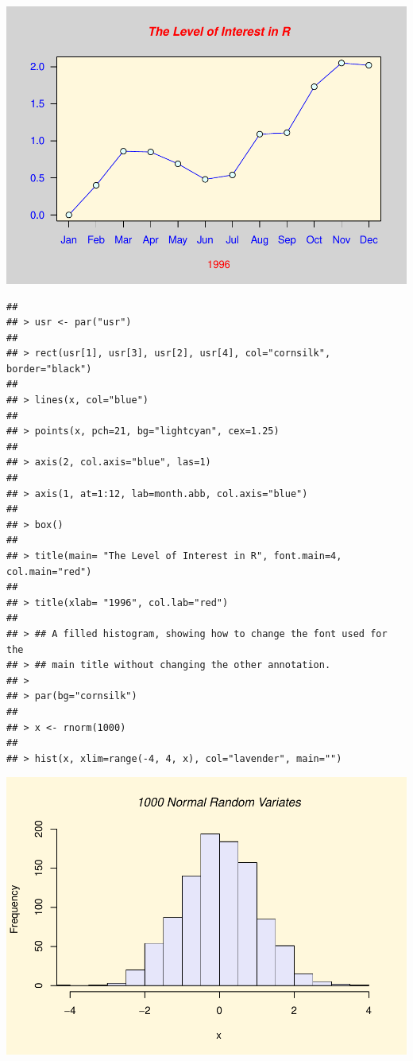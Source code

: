 \documentclass[
]{book}
\begin{document}
\includegraphics{bookdown-demo_files/figure-latex/unnamed-chunk-6-6.pdf}

\begin{verbatim}
## 
## > usr <- par("usr")
## 
## > rect(usr[1], usr[3], usr[2], usr[4], col="cornsilk", border="black")
## 
## > lines(x, col="blue")
## 
## > points(x, pch=21, bg="lightcyan", cex=1.25)
## 
## > axis(2, col.axis="blue", las=1)
## 
## > axis(1, at=1:12, lab=month.abb, col.axis="blue")
## 
## > box()
## 
## > title(main= "The Level of Interest in R", font.main=4, col.main="red")
## 
## > title(xlab= "1996", col.lab="red")
## 
## > ## A filled histogram, showing how to change the font used for the
## > ## main title without changing the other annotation.
## > 
## > par(bg="cornsilk")
## 
## > x <- rnorm(1000)
## 
## > hist(x, xlim=range(-4, 4, x), col="lavender", main="")
\end{verbatim}

\includegraphics{bookdown-demo_files/figure-latex/unnamed-chunk-6-7.pdf}
\end{document}
